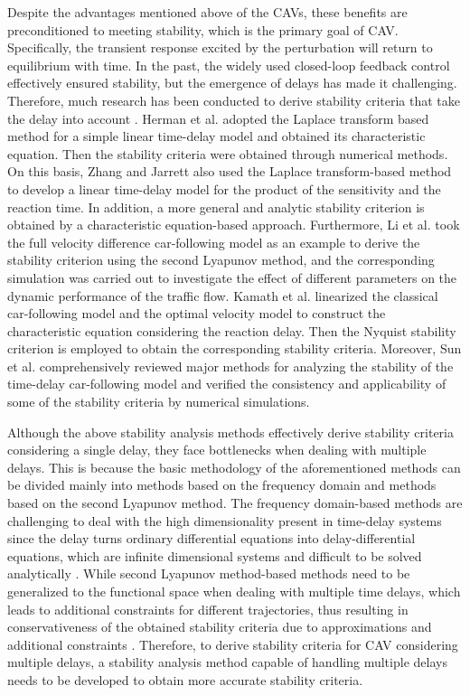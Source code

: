 \documentclass[journal]{IEEEtran}
\begin{document}
Despite the advantages mentioned above of the CAVs, these benefits are preconditioned to meeting stability, which is the primary goal of CAV. Specifically, the transient response excited by the perturbation will return to equilibrium with time. In the past, the widely used closed-loop feedback control effectively ensured stability, but the emergence of delays has made it challenging. Therefore, much research has been conducted to derive stability criteria that take the delay into account \citep{herman1959traffic,zhang1997stability,li2010lyapunov,li2013stability,kamath2015car,sun_stability_2018}. Herman et al. \citep{herman1959traffic} adopted the Laplace transform based method for a simple linear time-delay model and obtained its characteristic equation. Then the stability criteria were obtained through numerical methods. On this basis, Zhang and Jarrett \citep{zhang1997stability} also used the Laplace transform-based method to develop a linear time-delay model for the product of the sensitivity and the reaction time. In addition, a more general and analytic stability criterion is obtained by a characteristic equation-based approach. Furthermore, Li et al. \citep{li2010lyapunov,li2013stability} took the full velocity difference car-following model as an example to derive the stability criterion using the second Lyapunov method, and the corresponding simulation was carried out to investigate the effect of different parameters on the dynamic performance of the traffic flow. Kamath et al. \citep{kamath2015car} linearized the classical car-following model and the optimal velocity model to construct the characteristic equation considering the reaction delay. Then the Nyquist stability criterion is employed to obtain the corresponding stability criteria. Moreover, Sun et al. \citep{sun_stability_2018} comprehensively reviewed major methods for analyzing the stability of the time-delay car-following model and verified the consistency and applicability of some of the stability criteria by numerical simulations.

Although the above stability analysis methods effectively derive stability criteria considering a single delay, they face bottlenecks when dealing with multiple delays. This is because the basic methodology of the aforementioned methods can be divided mainly into methods based on the frequency domain and methods based on the second Lyapunov method. The frequency domain-based methods are challenging to deal with the high dimensionality present in time-delay systems since the delay turns ordinary differential equations into delay-differential equations, which are infinite dimensional systems and difficult to be solved analytically \citep{lhachemi2020feedback}. While second Lyapunov method-based methods need to be generalized to the functional space when dealing with multiple time delays, which leads to additional constraints for different trajectories, thus resulting in conservativeness of the obtained stability criteria due to approximations and additional constraints \citep{fridman2006descriptor,wang2016fuzzy,lian2020dissipativity}. Therefore, to derive stability criteria for CAV considering multiple delays, a stability analysis method capable of handling multiple delays needs to be developed to obtain more accurate stability criteria.
\end{document}
